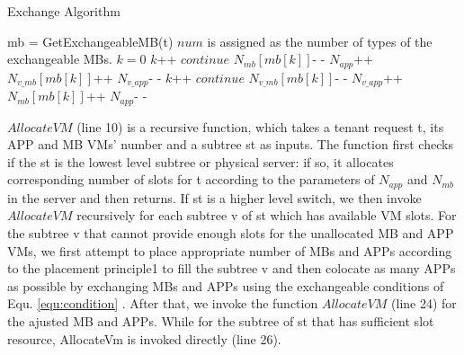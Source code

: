 \documentclass[review]{elsarticle}
\begin{document}
\begin{algorithm}[!htbp]
	\caption{Exchange Algorithm}
	\label{alg2}
\begin{algorithmic}[1]
	   \State mb = GetExchangeableMB(t)
	       \State $num$ is assigned as the number of types
	       \State of the exchangeable MBs.
	       \State $k = 0$
				   \State $k$++
				   \State $continue$
			   \EndIf
			   \State $N_{mb}[mb[k]]$- -
			   \State $N_{app}$++
		 	   \State $N_{v\_mb}[mb[k]]$++
			   \State $N_{v\_app}$- -
			\EndWhile
	    \Else
			   \State $k$++
			   \State $continue$
			\EndIf
			\State $N_{v\_mb}[mb[k]]$- -
			\State $N_{v\_app}$++
			\State $N_{mb}[mb[k]]$++
			\State $N_{app}$- -
		 \EndWhile
	   \EndIf
	  \EndIf
   \EndFunction    
  \end{algorithmic}
   
\end{algorithm}		

 $AllocateVM$ (line 10) is a recursive function, which takes a tenant request t, its APP and MB VMs’ number and a subtree st as inputs. The function first checks if the st is the lowest level subtree or physical server: if so, it allocates corresponding number of slots for t according to the parameters of $N_{app}$ and $N_{mb}$ in the server and then returns. If st is a higher level switch, we then invoke $AllocateVM$ recursively for each subtree v of st which has available VM slots. For the subtree v that cannot provide enough slots for the unallocated MB and APP VMs, we first attempt to place appropriate number of MBs and APPs according to the placement principle1 to fill the subtree v and then colocate as many APPs as possible by exchanging MBs and APPs using the exchangeable conditions of Equ. \ref{equ:condition} . After that, we invoke the function $AllocateVM$ (line 24) for the ajusted MB and APPs. While for the subtree of st that has sufficient slot resource, AllocateVm is invoked directly (line 26). 
\end{document}
